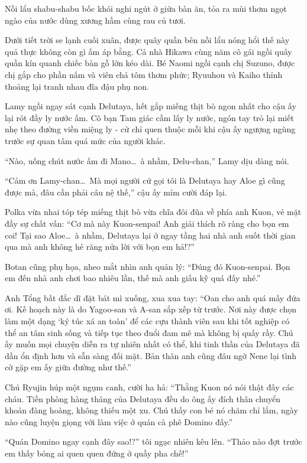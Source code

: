 \documentclass[../main.tex]{subfiles}
\begin{document}
\ct

Nồi lẩu shabu-shabu bốc khói nghi ngút ở giữa bàn ăn, tỏa ra mùi thơm ngọt ngào của nước dùng xương hầm cùng rau củ tươi.

Dưới tiết trời se lạnh cuối xuân, được quây quần bên nồi lẩu nóng hổi thế này quả thực không còn gì ấm áp bằng. Cả nhà Hikawa cùng năm cô gái ngồi quây quần kín quanh chiếc bàn gỗ lớn kéo dài. Bé Naomi ngồi cạnh chị Suzuno, được chị gắp cho phần nấm và viên chả tôm thơm phức; Ryuuhou và Kaiho thỉnh thoảng lại tranh nhau đĩa đậu phụ non.

Lamy ngồi ngay sát cạnh Delutaya, hết gắp miếng thịt bò ngon nhất cho cậu ấy lại rót đầy ly nước ấm. Cô bạn Tam giác cầm lấy ly nước, ngón tay trỏ lại miết nhẹ theo đường viền miệng ly - cử chỉ quen thuộc mỗi khi cậu ấy ngượng ngùng trước sự quan tâm quá mức của người khác.

``Nào, uống chút nước ấm đi Mano\dots\ à nhầm, Delu-chan,'' Lamy dịu dàng nói.

``Cảm ơn Lamy-chan\dots\ Mà mọi người cứ gọi tôi là Delutaya hay Aloe gì cũng được mà, đâu cần phải câu nệ thế,'' cậu ấy mỉm cười đáp lại.

Polka vừa nhai tóp tép miếng thịt bò vừa chĩa đôi đũa về phía anh Kuon, vẻ mặt đầy sự chất vấn: ``Cơ mà này Kuon-senpai! Anh giải thích rõ ràng cho bọn em coi! Tại sao Aloe\dots\ à nhầm, Delutaya lại ở ngay tầng hai nhà anh suốt thời gian qua mà anh không hé răng nửa lời với bọn em hả!?''

Botan cũng phụ họa, nheo mắt nhìn anh quản lý: ``Đúng đó Kuon-senpai. Bọn em đến nhà anh chơi bao nhiêu lần, thế mà anh giấu kỹ quá đấy nhé.''

Anh Tổng bất đắc dĩ đặt bát mì xuống, xua xua tay: ``Oan cho anh quá mấy đứa ơi. Kế hoạch này là do Yagoo-san và A-san sắp xếp từ trước. Nơi này được chọn làm một dạng `ký túc xá an toàn' để các cựu thành viên sau khi tốt nghiệp có thể an tâm sinh sống và tiếp tục theo đuổi đam mê mà không bị quấy rầy. Chú ấy muốn mọi chuyện diễn ra tự nhiên nhất có thể, khi tinh thần của Delutaya đã dần ổn định hơn và sẵn sàng đối mặt. Bản thân anh cũng đâu ngờ Nene lại tình cờ gặp em ấy giữa đường như thế.''

Chú Ryujin húp một ngụm canh, cười ha hả: ``Thằng Kuon nó nói thật đấy các cháu. Tiền phòng hàng tháng của Delutaya đều do ông ấy đích thân chuyển khoản đàng hoàng, không thiếu một xu. Chú thấy con bé nó chăm chỉ lắm, ngày nào cũng luyện giọng với làm việc ở quán cà phê Domino đấy.''

``Quán Domino ngay cạnh đây sao!?'' tôi ngạc nhiên kêu lên. ``Thảo nào đợt trước em thấy bóng ai quen quen đứng ở quầy pha chế!''
\end{document}
